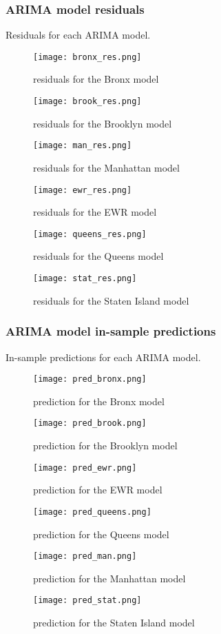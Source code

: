 \documentclass[article, 10 pt, conference]{ieeeconf}
\begin{document}
\subsubsection{ARIMA model residuals}
\label{app:model_residuals}
Residuals for each ARIMA model.
\begin{figure}[!htb]
    \texttt{[image: bronx\_res.png]}
    \caption{residuals for the Bronx model}
\end{figure}
\begin{figure}[!htb]
    \texttt{[image: brook\_res.png]}
    \caption{residuals for the Brooklyn model}
\end{figure}
\begin{figure}[!htb]
    \texttt{[image: man\_res.png]}
    \caption{residuals for the Manhattan model}
\end{figure}
\begin{figure}[!htb]
    \texttt{[image: ewr\_res.png]}
    \caption{residuals for the EWR model}
\end{figure}
\begin{figure}[!htb]
    \texttt{[image: queens\_res.png]}
    \caption{residuals for the Queens model}
\end{figure}
\begin{figure}[!htb]
    \texttt{[image: stat\_res.png]}
    \caption{residuals for the Staten Island model}
\end{figure}

\FloatBarrier
\subsubsection{ARIMA model in-sample predictions}
\label{app:model_pred}
In-sample predictions for each ARIMA model.
\begin{figure}[!htb]
    \texttt{[image: pred\_bronx.png]}
    \caption{prediction for the Bronx model}
\end{figure}
\begin{figure}[!htb]
    \texttt{[image: pred\_brook.png]}
    \caption{prediction for the Brooklyn model}
\end{figure}
\begin{figure}[!htb]
    \texttt{[image: pred\_ewr.png]}
    \caption{prediction for the EWR model}
\end{figure}
\begin{figure}[!htb]
    \texttt{[image: pred\_queens.png]}
    \caption{prediction for the Queens model}
\end{figure}
\begin{figure}[!htb]
    \texttt{[image: pred\_man.png]}
    \caption{prediction for the Manhattan model}
\end{figure}
\begin{figure}[!htb]
    \texttt{[image: pred\_stat.png]}
    \caption{prediction for the Staten Island model}
\end{figure}
\FloatBarrier
\end{document}
